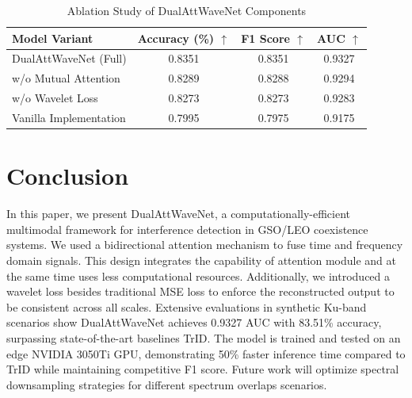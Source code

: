 \documentclass[conference]{IEEEtran}
\begin{document}
\begin{table}[tbp]
    \caption{Ablation Study of DualAttWaveNet Components}
    \label{tab:ablation}
    \centering

    \begin{tabular}{lccc}
        \toprule
        \textbf{Model Variant} & \textbf{Accuracy (\%)} $\uparrow$ & \textbf{F1 Score} $\uparrow$ & \textbf{AUC} $\uparrow$ \\
        \midrule
        DualAttWaveNet (Full)  & 0.8351                            & 0.8351                       & 0.9327                  \\
        \cmidrule{1-4}
        w/o Mutual Attention   & 0.8289                            & 0.8288                       & 0.9294                  \\
        w/o Wavelet Loss       & 0.8273                            & 0.8273                       & 0.9283                  \\
        Vanilla Implementation & 0.7995                            & 0.7975                       & 0.9175                  \\
        \bottomrule
    \end{tabular}

\end{table}

\section{Conclusion}
\label{sec:conclusion}

In this paper, we present DualAttWaveNet, a computationally-efficient multimodal framework for interference detection in GSO/LEO coexistence systems. We used a bidirectional attention mechanism to fuse time and frequency domain signals. This design integrates the capability of attention module and at the same time uses less computational resources. Additionally, we introduced a wavelet loss besides traditional MSE loss to enforce the reconstructed output to be consistent across all scales. Extensive evaluations in synthetic Ku-band scenarios show DualAttWaveNet achieves 0.9327 AUC with 83.51\% accuracy, surpassing state-of-the-art baselines TrID. The model is trained and tested on an edge NVIDIA 3050Ti GPU, demonstrating 50\% faster inference time compared to TrID while maintaining competitive F1 score. Future work will optimize spectral downsampling strategies for different spectrum overlaps scenarios.



\end{document}
